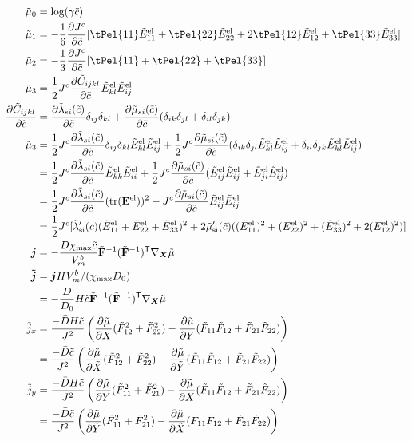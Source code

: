 \documentclass[../main.tex]{subfiles}
\begin{document}
\begin{align}
    \td{\mu}_0 &= \text{log}(\gamma \td{c}) \\
    \td{\mu}_1 &= -\fc{1}{6}\pdiff{\jc}{\tc} [\tPel{11}\tEel{11} + \tPel{22}\tEel{22} + 2\tPel{12}\tEel{12} + \tPel{33}\tEel{33}] \\
    \td{\mu}_2 &= -\fc{1}{3}\pdiff{ \jc}{\tc}[\tPel{11} + \tPel{22} + \tPel{33}] \\
    \td{\mu}_3 &= \fc{1}{2}\jc \pdiff{ \td{C}_{ijkl}}{\tc}\tEel{kl}\tEel{ij} \\
    \pdiff{\td{C}_{ijkl}}{\tc} &= \pdiff{\td{\lambda}_{si}(\tc)}{\tc}\delta_{ij} \delta_{kl} +  \pdiff{\td{\mu}_{si}(\tc)}{\tc}(\delta_{ik} \delta_{jl} + \delta_{il} \delta_{jk})  \\
    \td{\mu}_3  &=  \fc{1}{2}\jc \pdiff{\td{\lambda}_{si}(\tc)}{\tc}\delta_{ij} \delta_{kl} \tEel{kl}\tEel{ij} + \fc{1}{2}\jc\pdiff{\td{\mu}_{si}(\tc)}{\tc}(\delta_{ik} \delta_{jl} \tEel{kl}\tEel{ij} + \delta_{il} \delta_{jk} \tEel{kl}\tEel{ij}) \\
    &=  \fc{1}{2}\jc \pdiff{\td{\lambda}_{si}(\tc)}{\tc} \tEel{kk}\tEel{ii} + \fc{1}{2}\jc\pdiff{\td{\mu}_{si}(\tc)}{\tc}(\tEel{ij}\tEel{ij} +  \tEel{ji}\tEel{ij}) \\
    &=  \fc{1}{2}\jc \pdiff{\td{\lambda}_{si}(\tc)}{\tc} (\mathrm{tr}(\mathbf{E^{\rm{el}}}))^2 + \jc\pdiff{\td{\mu}_{si}(\tc)}{\tc}\tEel{ij}\tEel{ij} \\
    &= \fc{1}{2}\jc[\tlamsi'(c)(\tEel{11} + \tEel{22} + \tEel{33})^2 + 2\tmusi'(\td{c})((\tEel{11})^2 + (\tEel{22})^2 + (\tEel{33})^2 + 2 (\tEel{12})^2)]\\
    \bm{j} &= - \fc{D\xmax \tc}{V^b_m} \td{\F}^{-1} (\td{\F}^{-1})^\T \nabla_{\X} \td \mu \\
    \bm{\td j} &= \bm{j}H V_m^b/(\chi_{\text{max}}D_0)\\
                &= -\fc{D}{D_0}H \tc \td{\F}^{-1}(\td{\F}^{-1})^\T \nabla_{\X} \td \mu\\
    \td{j}_x &= \fc{-\bar{D} H \tc}{J^2} \left(\pdiff{ \td \mu}{X}(\tF{12}^2 + \tF{22}^2) - \pdiff{ \td \mu}{ Y}(\tF{11}\tF{12} + \tF{21}\tF{22})\right)\\
    &= \fc{-\bar{D}  \tc}{J^2} \left(\pdiff{ \td \mu}{\tX}(\tF{12}^2 + \tF{22}^2) - \pdiff{ \td \mu}{\tY}(\tF{11}\tF{12} + \tF{21}\tF{22})\right)\\
    \td{j}_y &= \fc{-\bar{D} H \tc}{J^2} \left(\pdiff{ \td \mu}{Y}(\tF{11}^2 + \tF{21}^2) - \pdiff{ \td \mu}{X}(\tF{11}\tF{12} + \tF{21}\tF{22})\right)\\
    &= \fc{-\bar{D}  \tc}{J^2} \left( \pdiff{ \td \mu}{\tY}(\tF{11}^2 + \tF{21}^2) -\pdiff{ \td \mu}{\tX}(\tF{11}\tF{12} + \tF{21}\tF{22})\right)
\end{align}
\end{document}
